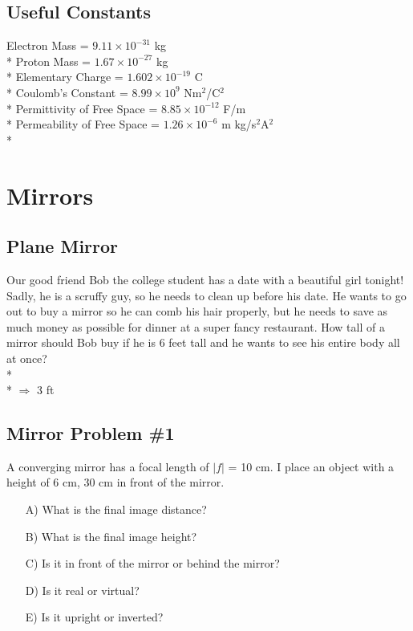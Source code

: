 \documentclass[11pt]{article}
\begin{document}
\maketitle
\tableofcontents
\hspace{30mm}

\subsection*{Useful Constants}
Electron Mass = $9.11 \times 10^{-31}$ kg \\*
Proton Mass = $1.67 \times 10^{-27}$ kg \\*
Elementary Charge = $1.602 \times 10^{-19}$ C \\*
Coulomb's Constant = $8.99 \times 10^9$ Nm$^2$/C$^2$ \\*
Permittivity of Free Space = $8.85 \times 10^{-12}$ F/m \\*
Permeability of Free Space = $1.26 \times 10^{-6}$ m kg/s$^2$A$^2$ \\*


\pagebreak
\section{Mirrors}

\subsection{Plane Mirror}
Our good friend Bob the college student has a date with a beautiful girl tonight!  Sadly, he is a scruffy guy, so he needs to clean up before his date.  He wants to go out to buy a mirror so he can comb his hair properly, but he needs to save as much money as possible for dinner at a super fancy restaurant.  How tall of a mirror should Bob buy if he is 6 feet tall and he wants to see his entire body all at once?\\*\\*
$\Rightarrow$ 3 ft

\subsection{Mirror Problem \#1}
A converging mirror has a focal length of $|f|$ = 10 cm.  I place an object with a height of 6 cm, 30 cm in front of the mirror.  

\begin{itemize}
\item[A)] What is the final image distance?
\item[B)] What is the final image height?
\item[C)] Is it in front of the mirror or behind the mirror?  
\item[D)] Is it real or virtual?
\item[E)] Is it upright or inverted?
\end{itemize}
\end{document}
